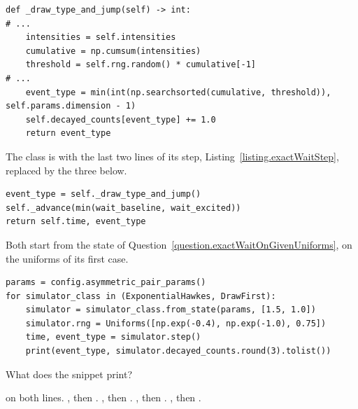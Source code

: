 \begin{question}
\begin{lstlisting}[caption={\protect\codehl{unito26.lob.hawkes.\_HawkesState}: the intensities, the decay and the type draw, their docstrings elided.}, label=listing.typeDrawState]
def _draw_type_and_jump(self) -> int:
# ...
    intensities = self.intensities
    cumulative = np.cumsum(intensities)
    threshold = self.rng.random() * cumulative[-1]
# ...
    event_type = min(int(np.searchsorted(cumulative, threshold)), self.params.dimension - 1)
    self.decayed_counts[event_type] += 1.0
    return event_type
\end{lstlisting}
The class  is 
with the last two lines of its step, Listing~\ref{listing.exactWaitStep},
replaced by the three below.
\begin{lstlisting}[caption={The end of the step of \protect\codehl{DrawFirst}}, label=listing.typeDrawnBeforeTheDecayVariant]
event_type = self._draw_type_and_jump()
self._advance(min(wait_baseline, wait_excited))
return self.time, event_type
\end{lstlisting}
Both start from the state of Question~\ref{question.exactWaitOnGivenUniforms},
on the uniforms of its first case.
\begin{lstlisting}[caption={One step of each class}, label=listing.typeDrawnBeforeTheDecayRun]
params = config.asymmetric_pair_params()
for simulator_class in (ExponentialHawkes, DrawFirst):
    simulator = simulator_class.from_state(params, [1.5, 1.0])
    simulator.rng = Uniforms([np.exp(-0.4), np.exp(-1.0), 0.75])
    time, event_type = simulator.step()
    print(event_type, simulator.decayed_counts.round(3).tolist())
\end{lstlisting}
What does the snippet print?
\begin{choices}
 \choice {} on both lines.
 \choice {}, then .
 \choice {}, then .
 \choice {}, then .
 \correctchoice {}, then .
\end{choices}
\end{question}

